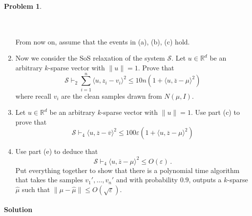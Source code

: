 \documentclass[11pt]{article}
\theoremstyle{definition}
\newtheorem{problem}[theorem]{Problem}
\newcommand{\R}{\mathbb{R}} %
\renewcommand{\epsilon}{\varepsilon}
\begin{document}
\begin{problem}
\begin{enumerate}[label=(\alph*)]
    \\\\
    From now on, assume that the events in (a), (b), (c) hold.
    \item Now we consider the SoS relaxation of the system $\mathcal{S}$.  Let $u \in \R^d$ be an arbitrary $k$-sparse vector with $\| u \| = 1$.  Prove that 
    \[
    \mathcal{S} \vdash_2 \sum_{i = 1}^n \langle u, z_i - v_i \rangle^2  \leq 10 n (1 + \langle u, \overline{z} - \mu \rangle^2  )
    \]
    where recall $v_i$ are the clean samples drawn from $N(\mu, I)$.    
    \item Let $u \in \R^d$ be an arbitrary $k$-sparse vector with $\| u \| = 1$.  Use part (c) to prove that 
    \[
    \mathcal{S} \vdash_4 \langle u, \overline{z} - \overline{v} \rangle^2 \leq   100 \epsilon  (1 + \langle u, \overline{z} - \mu \rangle^2  )
    \]
    \item Use part (e) to deduce that 
    \[
    \mathcal{S} \vdash_4 \langle u, \overline{z} - \mu \rangle^2 \leq O(\epsilon) \,.
    \]
    Put everything together to show that there is a polynomial time algorithm that takes the samples $v_1', \dots , v_n'$ and with probability $0.9$, outputs a $k$-sparse $\widehat{\mu}$ such that $\| \mu - \widehat{\mu} \| \leq O(\sqrt{\epsilon})$.
  \end{enumerate}
\end{problem}

\paragraph{Solution}
\end{document}
